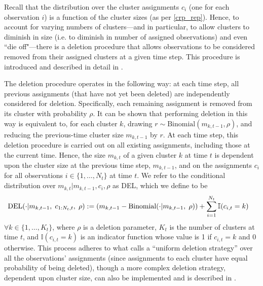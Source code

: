 \documentclass[twocolumn, final]{svjour3}
\begin{document}
Recall that the distribution over the cluster assignments $c_{i}$ (one for each observation $i$) is a function of the cluster sizes (as per \eqref{crp_rep}). Hence, to account for varying numbers of clusters---and in particular, to allow clusters to diminish in size (i.e. to diminish in number of assigned observations) and even ``die off"---there is a deletion procedure that allows observations to be considered removed from their assigned clusters at a given time step. This procedure is introduced and described in detail in \cite{caron_2007}.

The deletion procedure operates in the following way: at each time step, all previous assignments (that have not yet been deleted) are independently considered for deletion. Specifically, each remaining assignment is removed from its cluster with probability $\rho$.  It can be shown that performing deletion in this way is equivalent to, for each cluster $k$, drawing $r \sim \text{Binomial}(m_{k,t-1}, \rho)$, and reducing the previous-time cluster size $m_{k,t-1}$ by $r$. At each time step, this deletion procedure is carried out on all existing assignments, including those at the current time. Hence, the size $m_{k,t}$ of a given cluster $k$ at time $t$ is dependent upon the cluster size at the previous time step, $m_{k,t-1}$, and on the assignments $c_{i}$ for all observations $i \in \{ 1, \ldots, N_{t} \}$ at time $t$. We refer to the conditional distribution over $m_{k,t} | m_{k,t-1}, c_{i}, \rho$ as DEL, which we define to be
\begin{equation}
\begin{split}
\label{del_step}
\text{DEL} & (\cdot | m_{k,t-1}, \hspace{1mm} c_{1:N_{t}, t}, \hspace{1mm} \rho) :=
\left( m_{k,t-1} - \text{Binomial}( \cdot | {m_{k,t-1}, \hspace{1mm} \rho}) \right) + \sum_{i=1}^{N_{t}} \mathbb{I}(c_{i,t} = k)
\end{split}
\end{equation}
$\forall k \in \{1, \ldots, K_{t} \}$, where $\rho$ is a deletion parameter, $K_{t}$ is the number of clusters at time $t$, and $\mathbb{I}(c_{i,t} = k)$ is an indicator function whose value is 1 if $c_{i,t} = k$ and 0 otherwise. This process adheres to what \cite{caron_2007} calls a ``uniform deletion strategy'' over all the observations' assignments (since assignments to each cluster have equal probability of being deleted), though a more complex deletion strategy, dependent upon cluster size, can also be implemented and is described in \cite{caron_2007}.
\end{document}
